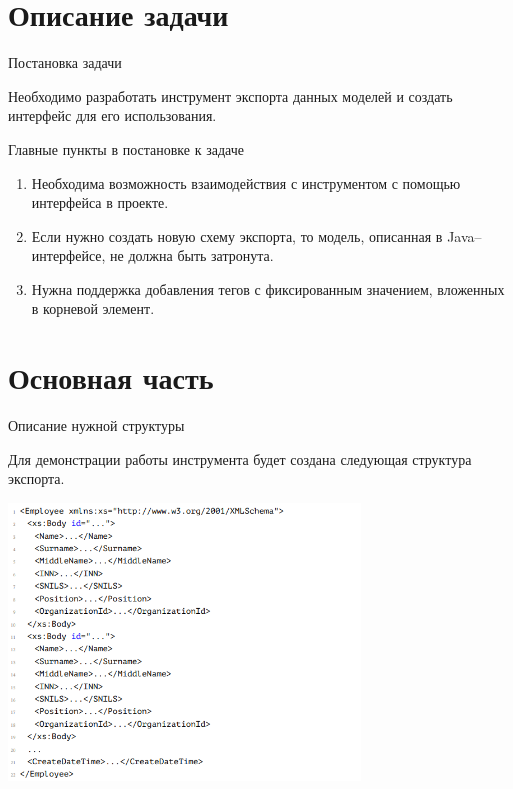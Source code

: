 \documentclass[fullscreen=true,russian,compress,%
	hyperref={unicode,bookmarks=false}]{presentation}
\begin{document}
\section{Описание задачи}

\begin{frame}{Постановка задачи}

Необходимо разработать инструмент экспорта данных моделей и создать интерфейс для его использования.

    \begin{block}{Главные пункты в постановке к задаче}
        \begin{enumerate}
	      \item Необходима возможность взаимодействия с инструментом с помощью интерфейса в проекте.
	      \item Если нужно создать новую схему экспорта, то модель, описанная в Java--интерфейсе, не должна быть затронута.
	      \item Нужна поддержка добавления тегов с фиксированным значением, вложенных в корневой элемент.
        \end{enumerate}
    \end{block}
    
\end{frame}

\section{Основная часть}

\begin{frame}{Описание нужной структуры}

Для демонстрации работы инструмента будет создана следующая структура экспорта.

\centerline{\includegraphics[width=0.7\textwidth]{imgs/xmlexampleasimg.png}}

\end{frame}
\end{document}
